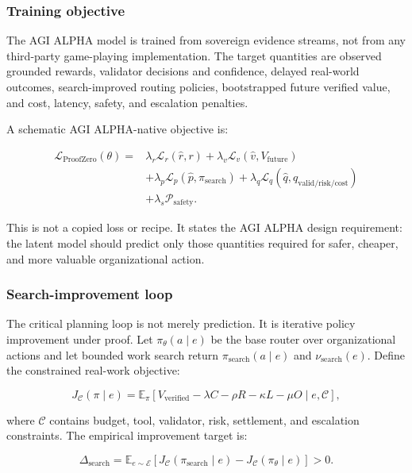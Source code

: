 \documentclass[
  11pt,
]{article}
\begin{document}
\subsubsection{Training objective}\label{training-objective}

The AGI ALPHA model is trained from sovereign evidence streams, not from
any third-party game-playing implementation. The target quantities are
observed grounded rewards, validator decisions and confidence, delayed
real-world outcomes, search-improved routing policies, bootstrapped
future verified value, and cost, latency, safety, and escalation
penalties.

A schematic AGI ALPHA-native objective is:

\[
\begin{aligned}
\mathcal{L}_{\mathrm{ProofZero}}(\theta)={}&
\lambda_r\mathcal{L}_r(\hat r,r)
+\lambda_v\mathcal{L}_v(\hat v,V_{\mathrm{future}})\\
&+\lambda_p\mathcal{L}_p(\hat p,\pi_{\mathrm{search}})
+\lambda_q\mathcal{L}_q(\hat q,q_{\mathrm{valid/risk/cost}})\\
&+\lambda_s\mathcal{P}_{\mathrm{safety}}.
\end{aligned}
\]

This is not a copied loss or recipe. It states the AGI ALPHA design
requirement: the latent model should predict only those quantities
required for safer, cheaper, and more valuable organizational action.

\subsubsection{Search-improvement loop}\label{search-improvement-loop}

The critical planning loop is not merely prediction. It is iterative
policy improvement under proof. Let \(\pi_\theta(a\mid e)\) be the base
router over organizational actions and let bounded work search return
\(\pi_{\mathrm{search}}(a\mid e)\) and \(\nu_{\mathrm{search}}(e)\).
Define the constrained real-work objective:

\[
J_{\mathcal{C}}(\pi\mid e)=\mathbb{E}_{\pi}\left[V_{\mathrm{verified}}-\lambda C-\rho R-\kappa L-\mu O\mid e,\mathcal{C}\right],
\]

where \(\mathcal{C}\) contains budget, tool, validator, risk,
settlement, and escalation constraints. The empirical improvement target
is:

\[
\Delta_{\mathrm{search}} = \mathbb{E}_{e\sim \mathcal{E}}\left[J_{\mathcal{C}}(\pi_{\mathrm{search}}\mid e)-J_{\mathcal{C}}(\pi_\theta\mid e)\right] > 0.
\]
\end{document}

